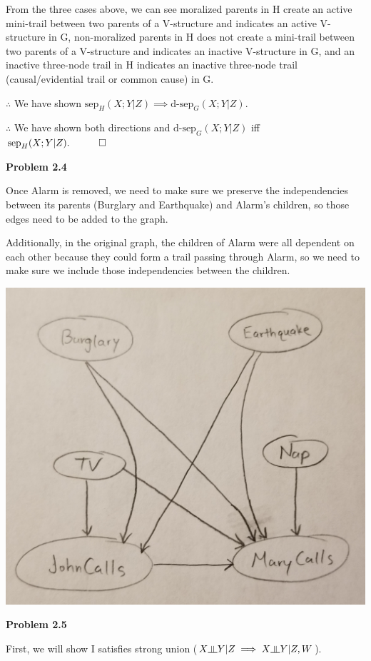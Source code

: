 \documentclass[12pt]{article}
\newcommand{\indep}{\rotatebox[origin=c]{90}{$\models$}}
\begin{document}
From the three cases above, we can see moralized parents in H create an active mini-trail between two parents of a V-structure and indicates an active V-structure in G, non-moralized parents in H does not create a mini-trail between two parents of a V-structure and indicates an inactive V-structure in G, and an inactive three-node trail in H indicates an inactive three-node trail (causal/evidential trail or common cause) in G.

$\therefore$ We have shown $\text{sep}_H(X; Y \vert Z) \implies \text{d-sep}_G(X; Y \vert Z)$.

$\therefore$ We have shown both directions and $\text{d-sep}_G(X; Y \vert Z)$ iff $\text{sep}_H(X; Y \vert Z). \quad\qed$

\pagebreak\textbf{Problem 2.4}

Once Alarm is removed, we need to make sure we preserve the independencies between its parents (Burglary and Earthquake) and Alarm's children, so those edges need to be added to the graph.

Additionally, in the original graph, the children of Alarm were all dependent on each other because they could form a trail passing through Alarm, so we need to make sure we include those independencies between the children.

\includegraphics[scale=0.2]{q2-sub4}

\pagebreak\textbf{Problem 2.5}

First, we will show I satisfies strong union ($X \indep Y \vert Z \implies X \indep Y \vert Z, W$).
\end{document}

